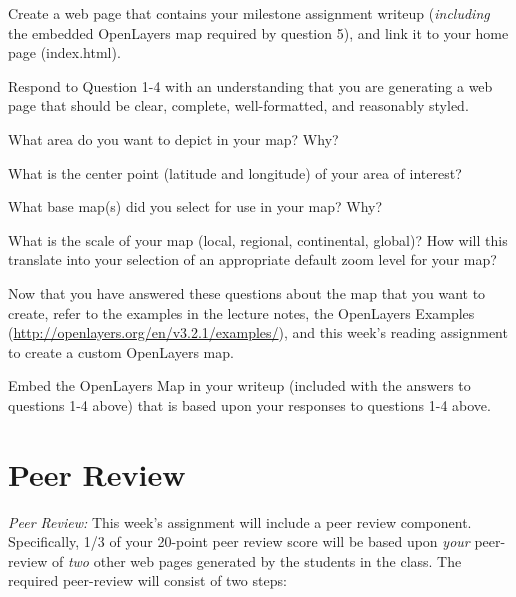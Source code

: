 \documentclass[]{book}
\providecommand{\tightlist}{%
  \setlength{\itemsep}{0pt}\setlength{\parskip}{0pt}}
\begin{document}
Create a web page that contains your milestone assignment writeup
(\emph{including} the embedded OpenLayers map required by question 5),
and link it to your home page (index.html).

Respond to Question 1-4 with an understanding that you are generating a
web page that should be clear, complete, well-formatted, and reasonably
styled.

\begin{description}
\tightlist
\item[Question 1]
What area do you want to depict in your map? Why?
\item[Question 2]
What is the center point (latitude and longitude) of your area of
interest?
\item[Question 3]
What base map(s) did you select for use in your map? Why?
\item[Question 4]
What is the scale of your map (local, regional, continental, global)?
How will this translate into your selection of an appropriate default
zoom level for your map?
\end{description}

Now that you have answered these questions about the map that you want
to create, refer to the examples in the lecture notes, the OpenLayers
Examples (\url{http://openlayers.org/en/v3.2.1/examples/}), and this
week's reading assignment to create a custom OpenLayers map.

\begin{description}
\tightlist
\item[Question 5]
Embed the OpenLayers Map in your writeup (included with the answers to
questions 1-4 above) that is based upon your responses to questions 1-4
above.
\end{description}

\section{Peer Review}\label{peer-review}

\emph{Peer Review:} This week's assignment will include a peer review
component. Specifically, 1/3 of your 20-point peer review score will be
based upon \emph{your} peer-review of \emph{two} other web pages
generated by the students in the class. The required peer-review will
consist of two steps:
\end{document}
